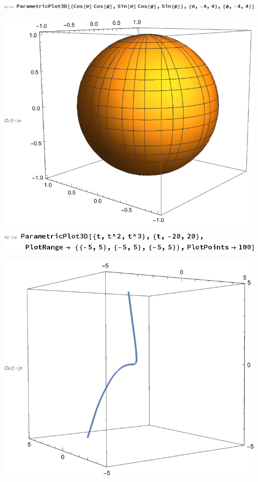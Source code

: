 \documentclass{article}
\begin{document}
\includegraphics{gr_gr1.eps}

\includegraphics{gr_gr2.eps}

\includegraphics{gr_gr3.eps}

\includegraphics{gr_gr4.eps}
\end{document}
